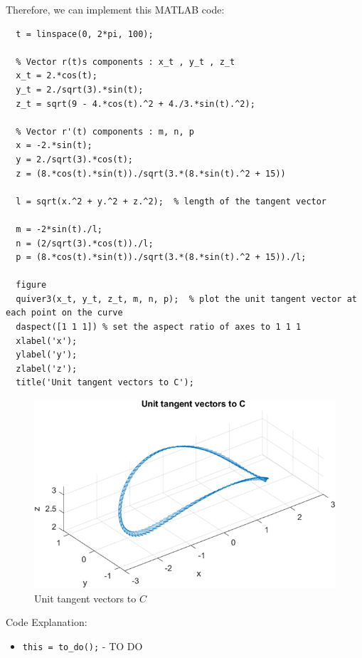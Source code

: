 Therefore, we can implement this MATLAB code:
\begin{lstlisting}[style=Matlab-editor]
  % Plot the unit tangent vector at anypoint on the curve C
  t = linspace(0, 2*pi, 100);
  
  % Vector r(t)s components : x_t , y_t , z_t
  x_t = 2.*cos(t);
  y_t = 2./sqrt(3).*sin(t);
  z_t = sqrt(9 - 4.*cos(t).^2 + 4./3.*sin(t).^2);
  
  % Vector r'(t) components : m, n, p
  x = -2.*sin(t);
  y = 2./sqrt(3).*cos(t);
  z = (8.*cos(t).*sin(t))./sqrt(3.*(8.*sin(t).^2 + 15))
  
  l = sqrt(x.^2 + y.^2 + z.^2);  % length of the tangent vector
  
  m = -2*sin(t)./l;
  n = (2/sqrt(3).*cos(t))./l;
  p = (8.*cos(t).*sin(t))./sqrt(3.*(8.*sin(t).^2 + 15))./l;
  
  figure
  quiver3(x_t, y_t, z_t, m, n, p);  % plot the unit tangent vector at each point on the curve
  daspect([1 1 1]) % set the aspect ratio of axes to 1 1 1
  xlabel('x');
  ylabel('y');
  zlabel('z');
  title('Unit tangent vectors to C');
\end{lstlisting}

\begin{figure}[H]
  \centering
  \includegraphics[width=12cm]{graphics/3c.png}
  \caption{Unit tangent vectors to $C$}
\end{figure}

\vspace*{1cm}

Code Explanation:
\begin{itemize}
    \item \verb!this = to_do();! - TO DO
  \end{itemize}